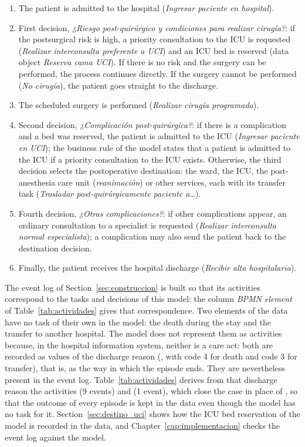 \begin{enumerate}[leftmargin=*]
  \item The patient is admitted to the hospital (\emph{Ingresar paciente en hospital}).
  \item First decision, \emph{¿Riesgo post-quirúrgico y condiciones para realizar cirugía?}: if the postsurgical risk is high, a priority consultation to the ICU is requested (\emph{Realizar interconsulta preferente a UCI}) and an ICU bed is reserved (data object \emph{Reserva cama UCI}). If there is no risk and the surgery can be performed, the process continues directly. If the surgery cannot be performed (\emph{No cirugía}), the patient goes straight to the discharge.
  \item The scheduled surgery is performed (\emph{Realizar cirugía programada}).
  \item Second decision, \emph{¿Complicación post-quirúrgica?}: if there is a complication and a bed was reserved, the patient is admitted to the ICU (\emph{Ingresar paciente en UCI}); the business rule of the model states that a patient is admitted to the ICU if a priority consultation to the ICU exists. Otherwise, the third decision selects the postoperative destination: the ward, the ICU, the post-anesthesia care unit (\emph{reanimación}) or other services, each with its transfer task (\emph{Trasladar post-quirúrgicamente paciente a\ldots}).
  \item Fourth decision, \emph{¿Otras complicaciones?}: if other complications appear, an ordinary consultation to a specialist is requested (\emph{Realizar interconsulta normal especialista}); a complication may also send the patient back to the destination decision.
  \item Finally, the patient receives the hospital discharge (\emph{Recibir alta hospitalaria}).
\end{enumerate}

The event log of Section~\ref{sec:construccion} is built so that its activities correspond to the tasks and decisions of this model: the column \emph{BPMN element} of Table~\ref{tab:actividades} gives that correspondence. Two elements of the data have no task of their own in the model: the death during the stay and the transfer to another hospital. The model does not represent them as activities because, in the hospital information system, neither is a care act: both are recorded as values of the discharge reason (, with code 4 for death and code 3 for transfer), that is, as the way in which the episode ends. They are nevertheless present in the event log. Table~\ref{tab:actividades} derives from that discharge reason the activities  (9 events) and  (1 event), which close the case in place of , so that the outcome of every episode is kept in the data even though the model has no task for it. Section~\ref{sec:destino_uci} shows how the ICU bed reservation of the model is recorded in the data, and Chapter~\ref{cap:implementacion} checks the event log against the model.

